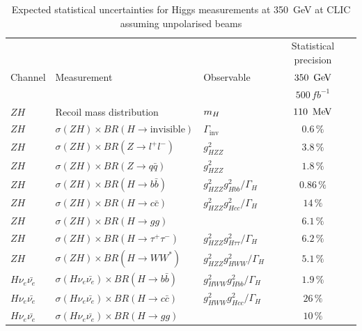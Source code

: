\begin{table}
  \centering
  \begin{tabular}{lllc}\toprule
     &                                                           &                              & Statistical precision                        \\\cmidrule(l){4-4}
     Channel  & Measurement                                        & Observable            & $350\,\GeV$       \\ 
     &                                                           &                              & $500\,fb^{-1}$        \\ \midrule
     $ZH$            & Recoil mass distribution                                  & $m_H$                        & $110\,\MeV$  \\
     $ZH$            & $\sigma(ZH)\times BR(H\rightarrow \text{invisible})$         & $\Gamma_\text{inv}$          & $0.6\,\%$  \\ \midrule
     $ZH$            & $\sigma(ZH)\times BR(Z\rightarrow l^+l^-)$             & $g^{2}_{HZZ}$                  & $3.8\,\%$  \\
     $ZH$            & $\sigma(ZH)\times BR(Z\rightarrow q\bar{q})$                  & $g^{2}_{HZZ}$                  & $1.8\,\%$  \\
     $ZH$            & $\sigma(ZH)\times BR(H\rightarrow b\bar{b})$                & $g^{2}_{HZZ}g^{2}_{Hbb}/\Gamma_H$     & $0.86\,\%$ \\
     $ZH$            & $\sigma(ZH)\times BR(H\rightarrow c\bar{c})$                & $g^{2}_{HZZ}g^{2}_{Hcc}/\Gamma_H$       & $14\,\%$ \\
     $ZH$            & $\sigma(ZH)\times BR(H\rightarrow gg)$                   &                              & $6.1\,\%$ \\
     $ZH$            & $\sigma(ZH)\times BR(H\rightarrow \tau^+\tau^-)$               & $g^{2}_{HZZ}g^{2}_{H\tau\tau}/\Gamma_H$ & $6.2\,\%$ \\
     $ZH$            & $\sigma(ZH)\times BR(H\rightarrow WW^*)$                 & $g^{2}_{HZZ}g^{2}_{HWW}/\Gamma_H$     & $5.1\,\%$ \\
     $H\nu_e\bar{\nu_e}$    & $\sigma(H\nu_e\bar{\nu_e})\times BR(H\rightarrow b\bar{b})$        & $g^{2}_{HWW}g^{2}_{Hbb}/\Gamma_H$     & $1.9\,\%$ \\
     $H\nu_e\bar{\nu_e}$    & $\sigma(H\nu_e\bar{\nu_e})\times BR(H\rightarrow c\bar{c})$        & $g^{2}_{HWW}g^{2}_{Hcc}/\Gamma_H$     & $26\,\%$ \\
     $H\nu_e\bar{\nu_e}$    & $\sigma(H\nu_e\bar{\nu_e})\times BR(H\rightarrow gg)$        &     & $10\,\%$ \\    
     \bottomrule
   \end{tabular}
   \caption[Expected statistical uncertainties for Higgs measurements at 350~GeV at CLIC assuming unpolarised beams]{Expected statistical uncertainties for Higgs measurements at 350~GeV at CLIC assuming unpolarised beams \cite{Abramowicz:2016zbo}}
   \label{fig:350GeVNumbers}
\end{table}

